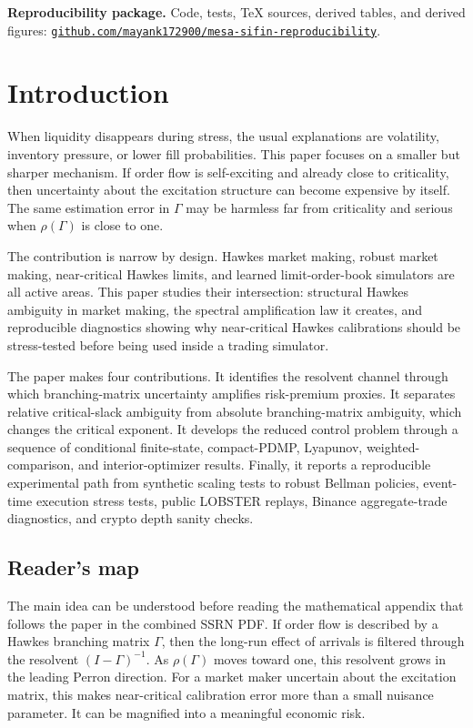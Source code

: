 \documentclass[11pt]{article}
\begin{document}
\medskip
\noindent\textbf{Reproducibility package.}
Code, tests, TeX sources, derived tables, and derived figures:
\href{https://github.com/mayank172900/mesa-sifin-reproducibility}{\texttt{github.com/mayank172900/mesa-sifin-reproducibility}}.

\section{Introduction}

When liquidity disappears during stress, the usual explanations are volatility,
inventory pressure, or lower fill probabilities. This paper focuses on a
smaller but sharper mechanism. If order flow is self-exciting and already close
to criticality, then uncertainty about the excitation structure can become
expensive by itself. The same estimation error in $\Gamma$ may be harmless far
from criticality and serious when $\rho(\Gamma)$ is close to one.

The contribution is narrow by design. Hawkes market making, robust market
making, near-critical Hawkes limits, and learned limit-order-book simulators
are all active areas. This paper studies their intersection:
structural Hawkes ambiguity in market making, the spectral amplification law it
creates, and reproducible diagnostics showing why near-critical Hawkes
calibrations should be stress-tested before being used inside a trading
simulator.

The paper makes four contributions. It identifies the resolvent channel through
which branching-matrix uncertainty amplifies risk-premium proxies. It separates
relative critical-slack ambiguity from absolute branching-matrix ambiguity,
which changes the critical exponent. It develops the reduced control problem
through a sequence of conditional finite-state, compact-PDMP, Lyapunov,
weighted-comparison, and interior-optimizer results. Finally, it reports
a reproducible experimental path from synthetic scaling tests to robust Bellman
policies, event-time execution
stress tests, public LOBSTER replays, Binance aggregate-trade diagnostics, and
crypto depth sanity checks.

\subsection*{Reader's map}

The main idea can be understood before reading the mathematical appendix that
follows the paper in the combined SSRN PDF. If order flow is described by a
Hawkes branching matrix $\Gamma$,
then the long-run effect of arrivals is filtered through the resolvent
$(I-\Gamma)^{-1}$. As $\rho(\Gamma)$ moves toward one, this resolvent grows in
the leading Perron direction. For a market maker uncertain about the excitation
matrix, this makes near-critical calibration error more than a small nuisance
parameter. It can be magnified into a meaningful economic risk.
\end{document}
